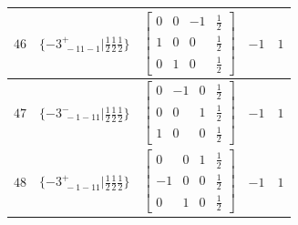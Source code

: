 \documentclass[fleqn,8pt]{jsarticle}
\begin{document}
\begin{longtable}{ccccc}
$ 46 $ & $ \{-3^{+}_{\,\,-11-1}|\frac{1}{2} \frac{1}{2} \frac{1}{2}\} $ & $ \begin{bmatrix} 0 & 0 & -1 & \frac{1}{2} \\ 1 & 0 & 0 & \frac{1}{2} \\ 0 & 1 & 0 & \frac{1}{2} \end{bmatrix} $ & $ -1 $ & $ 1 $ \\ \hline
$ 47 $ & $ \{-3^{-}_{\,\,-1-11}|\frac{1}{2} \frac{1}{2} \frac{1}{2}\} $ & $ \begin{bmatrix} 0 & -1 & 0 & \frac{1}{2} \\ 0 & 0 & 1 & \frac{1}{2} \\ 1 & 0 & 0 & \frac{1}{2} \end{bmatrix} $ & $ -1 $ & $ 1 $ \\ \hline
$ 48 $ & $ \{-3^{+}_{\,\,-1-11}|\frac{1}{2} \frac{1}{2} \frac{1}{2}\} $ & $ \begin{bmatrix} 0 & 0 & 1 & \frac{1}{2} \\ -1 & 0 & 0 & \frac{1}{2} \\ 0 & 1 & 0 & \frac{1}{2} \end{bmatrix} $ & $ -1 $ & $ 1 $ \\
\end{longtable}
\end{document}
